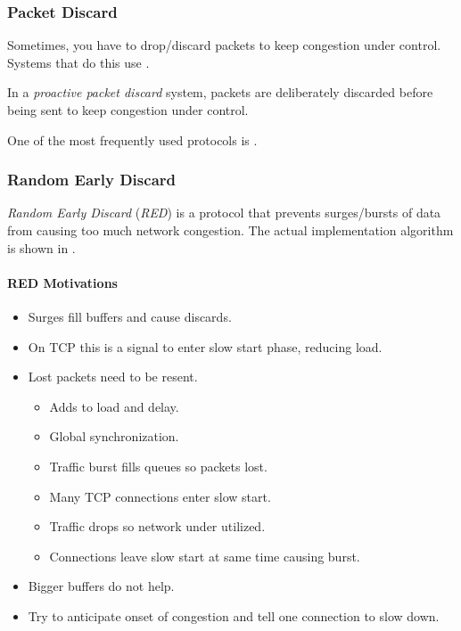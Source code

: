 \subsubsection{Packet Discard}\label{subsubsec:Packet_Discard}
Sometimes, you have to drop/discard packets to keep congestion under control.
Systems that do this use .

\begin{definition}\label{def:Proactive_Packet_Discard}
  In a \emph{proactive packet discard} system, packets are deliberately discarded before being sent to keep congestion under control.
\end{definition}

One of the most frequently used protocols is .

\subsubsection{Random Early Discard}\label{subsubsec:Random_Early_Discard}
\begin{definition}\label{def:Random_Early_Discard}
  \emph{Random Early Discard} (\emph{RED}) is a protocol that prevents surges/bursts of data from causing too much network congestion.
  The actual implementation algorithm is shown in .
\end{definition}

\paragraph{RED Motivations}\label{par:Random_Early_Discard_Motivations}
\begin{itemize}[noitemsep]
\item Surges fill buffers and cause discards.
\item On TCP this is a signal to enter slow start phase, reducing load.
\item Lost packets need to be resent.
  \begin{itemize}[noitemsep]
  \item Adds to load and delay.
  \item Global synchronization.
  \item Traffic burst fills queues so packets lost.
  \item Many TCP connections enter slow start.
  \item Traffic drops so network under utilized.
  \item Connections leave slow start at same time causing burst.
  \end{itemize}
\item Bigger buffers do not help.
\item Try to anticipate onset of congestion and tell one connection to slow down.
\end{itemize}

